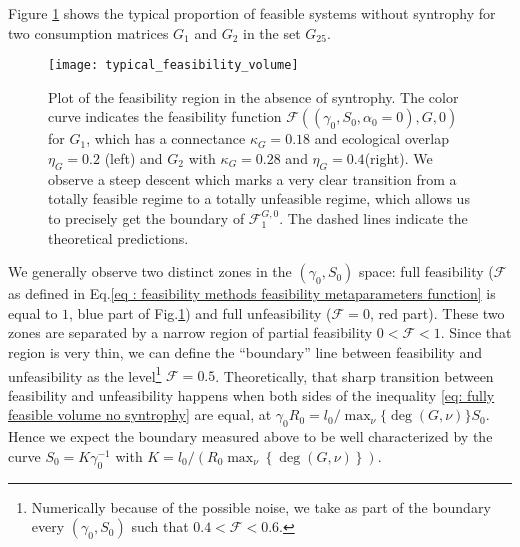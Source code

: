 \documentclass[12pt, titlepage]{report}
\begin{document}
Figure \ref{fig: typical feasibility region} shows the typical proportion of feasible systems without syntrophy %
for two consumption matrices $G_1$ and $G_2$ in the set $G_{25}$.
\begin{figure}[h!]
\centering
\texttt{[image: typical\_feasibility\_volume]}
\caption{Plot of the feasibility region in the absence of syntrophy. The color curve indicates the feasibility function $\mathcal{F}\left((\gamma_0, S_0, \alpha_0=0), G, 0\right)$ for $G_1$, which has a connectance $\kappa_{G}=0.18$ and ecological overlap $\eta_{G}=0.2$ (left) and $G_2$ with $\kappa_G=0.28$ and $\eta_G=0.4$(right). We observe a steep descent which marks a very clear transition from a totally feasible regime to a totally unfeasible regime, which allows us to precisely get the boundary of $\mathcal{F}^{G, 0}_1$. The dashed lines indicate the theoretical predictions.}
\label{fig: typical feasibility region}
\end{figure}
We generally observe two distinct zones in the $(\gamma_0, S_0)$ space: full feasibility ($\mathcal{F}$ as defined in Eq.\eqref{eq : feasibility methods feasibility metaparameters function} is equal to $1$, blue part of Fig.\ref{fig: typical feasibility region}) and full unfeasibility ($\mathcal{F}=0$, red part). These two zones are separated by a narrow region of partial feasibility $0 <\mathcal{F}<1$. Since that region is very thin, we can define  the ``boundary'' line between feasibility and unfeasibility as the level\footnote{Numerically because of the possible noise, we take as part of the boundary every $(\gamma_0, S_0)$ such that $0.4 < \mathcal{F} <0.6$.} $\mathcal{F}=0.5$. Theoretically, that sharp transition between feasibility and unfeasibility happens when both sides of the inequality \eqref{eq: fully feasible volume no syntrophy} are equal, \ie at $\gamma_0 R_0 = l_0/\max_\nu\{\deg(G,\nu)\}S_0$. Hence we expect the boundary measured above to be well characterized by the curve $S_0 = K \gamma_0^{-1}$ with $K=l_0/(R_0 \max_\nu\left\{\deg(G,\nu)\right\})$.
\end{document}
